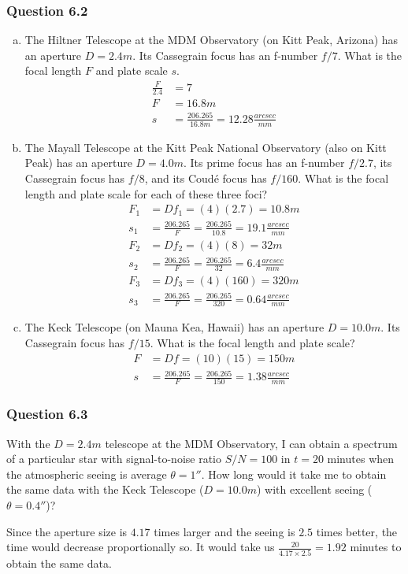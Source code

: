 \documentclass{math}
\begin{document}
\subsubsection*{Question 6.2}
\begin{enumerate}[(a)]
  \item The Hiltner Telescope at the MDM Observatory (on Kitt Peak, Arizona)
    has an aperture \( D = 2.4m \). Its Cassegrain focus has an f-number
    \( f/7 \). What is the focal length \( F \) and plate scale \( s \).
    \begin{align*}
      \frac{F}{2.4} &= 7 \\
      F &= 16.8m \\
      s &= \frac{206.265}{16.8m} = 12.28\frac{arcsec}{mm}
    \end{align*}
  \item The Mayall Telescope at the Kitt Peak National Observatory (also on
    Kitt Peak) has an aperture \( D = 4.0m \). Its prime focus has an f-number
    \( f/2.7 \), its Cassegrain focus has \( f/8 \), and its Coud\'{e} focus
    has \( f/160 \). What is the focal length and plate scale for each of these
    three foci?
    \begin{align*}
      F_1 &= Df_1 = (4)(2.7) = 10.8m \\
      s_1 &= \frac{206.265}{F} = \frac{206.265}{10.8} = 19.1\frac{arcsec}{mm} \\
      F_2 &= Df_2 = (4)(8) = 32m \\
      s_2 &= \frac{206.265}{F} = \frac{206.265}{32} = 6.4\frac{arcsec}{mm} \\
      F_3 &= Df_3 = (4)(160) = 320m \\
      s_3 &= \frac{206.265}{F} = \frac{206.265}{320} = 0.64\frac{arcsec}{mm}
    \end{align*}
  \item The Keck Telescope (on Mauna Kea, Hawaii) has an aperture
    \( D = 10.0m \). Its Cassegrain focus has \( f/15 \). What is the focal
    length and plate scale?
    \begin{align*}
      F &= Df = (10)(15) = 150m \\
      s &= \frac{206.265}{F} = \frac{206.265}{150} = 1.38\frac{arcsec}{mm}
    \end{align*}
\end{enumerate}

\subsubsection*{Question 6.3}
With the \( D = 2.4m \) telescope at the MDM Observatory, I can obtain a
spectrum of a particular star with signal-to-noise ratio \( S/N = 100 \) in
\( t = 20 \) minutes when the atmospheric seeing is average \( \theta = 1'' \).
How long would it take me to obtain the same data with the Keck Telescope
(\( D = 10.0m \)) with excellent seeing (\( \theta = 0.4'' \))? \par
Since the aperture size is \( 4.17 \) times larger and the seeing is \( 2.5 \)
times better, the time would decrease proportionally so. It would take us
\( \frac{20}{4.17\times2.5} = 1.92 \) minutes to obtain the same data.
\end{document}
